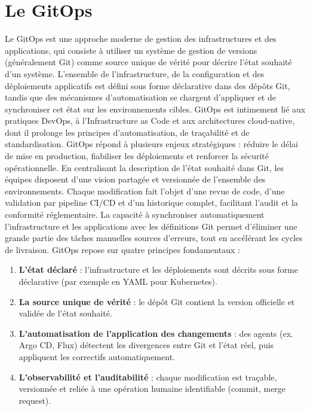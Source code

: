 \section{Le GitOps}

Le GitOps est une approche moderne de gestion des infrastructures et des applications, qui consiste à utiliser un système de gestion de versions (généralement Git) comme source unique de vérité pour décrire l’état souhaité d’un système. L’ensemble de l’infrastructure, de la configuration et des déploiements applicatifs est défini sous forme déclarative dans des dépôts Git, tandis que des mécanismes d’automatisation se chargent d’appliquer et de synchroniser cet état sur les environnements cibles. GitOps est intimement lié aux pratiques DevOps, à l’Infrastructure as Code et aux architectures cloud-native, dont il prolonge les principes d’automatisation, de traçabilité et de standardisation.
GitOps répond à plusieurs enjeux stratégiques : réduire le délai de mise en production, fiabiliser les déploiements et renforcer la sécurité opérationnelle. En centralisant la description de l’état souhaité dans Git, les équipes disposent d’une vision partagée et versionnée de l’ensemble des environnements. Chaque modification fait l’objet d’une revue de code, d’une validation par pipeline CI/CD et d’un historique complet, facilitant l’audit et la conformité réglementaire. La capacité à synchroniser automatiquement l’infrastructure et les applications avec les définitions Git permet d’éliminer une grande partie des tâches manuelles sources d’erreurs, tout en accélérant les cycles de livraison.
GitOps repose sur quatre principes fondamentaux :
\begin{enumerate}
	\item \textbf{L’état déclaré} : l’infrastructure et les déploiements sont décrits sous forme déclarative (par exemple en YAML pour Kubernetes).
	\item \textbf{La source unique de vérité} : le dépôt Git contient la version officielle et validée de l’état souhaité.
	\item \textbf{L’automatisation de l’application des changements} : des agents (ex. Argo CD, Flux) détectent les divergences entre Git et l’état réel, puis appliquent les correctifs automatiquement.
	\item \textbf{L’observabilité et l’auditabilité} : chaque modification est traçable, versionnée et reliée à une opération humaine identifiable (commit, merge request).
\end{enumerate}

